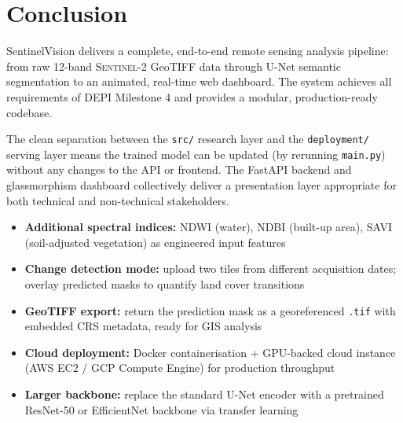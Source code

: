 \documentclass[12pt, a4paper]{article}
\newcommand{\sentinel}{\textsc{Sentinel-2}}
\newcommand{\tif}{\texttt{.tif}}
\begin{document}
\section{Conclusion}

SentinelVision delivers a complete, end-to-end remote sensing analysis pipeline: from raw 12-band \sentinel{} GeoTIFF data through U-Net semantic segmentation to an animated, real-time web dashboard. The system achieves all requirements of DEPI Milestone 4 and provides a modular, production-ready codebase.

The clean separation between the \texttt{src/} research layer and the \texttt{deployment/} serving layer means the trained model can be updated (by rerunning \texttt{main.py}) without any changes to the API or frontend. The FastAPI backend and glassmorphism dashboard collectively deliver a presentation layer appropriate for both technical and non-technical stakeholders.

\begin{keybox}
\begin{itemize}[leftmargin=*, noitemsep]
  \item \textbf{Additional spectral indices:} NDWI (water), NDBI (built-up area), SAVI (soil-adjusted vegetation) as engineered input features
  \item \textbf{Change detection mode:} upload two tiles from different acquisition dates; overlay predicted masks to quantify land cover transitions
  \item \textbf{GeoTIFF export:} return the prediction mask as a georeferenced \tif{} with embedded CRS metadata, ready for GIS analysis
  \item \textbf{Cloud deployment:} Docker containerisation + GPU-backed cloud instance (AWS EC2 / GCP Compute Engine) for production throughput
  \item \textbf{Larger backbone:} replace the standard U-Net encoder with a pretrained ResNet-50 or EfficientNet backbone via transfer learning
\end{itemize}
\end{keybox}
\end{document}
